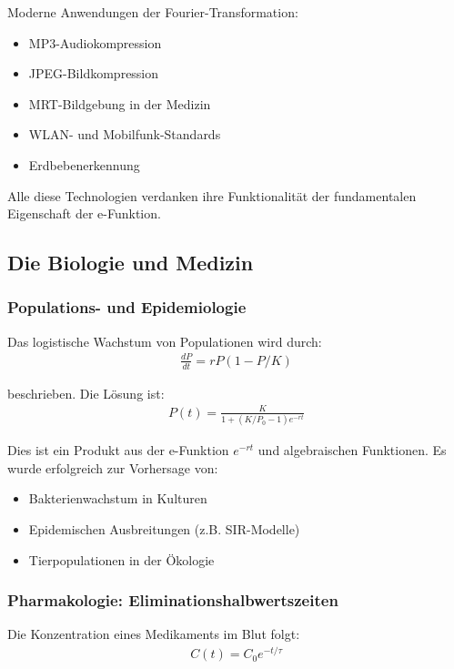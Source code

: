 \documentclass[a4paper,12pt,twoside]{report}
\theoremstyle{definition}
\begin{document}
Moderne Anwendungen der Fourier-Transformation:
\begin{itemize}
	\item[-] MP3-Audiokompression
	\item[-] JPEG-Bildkompression
	\item[-] MRT-Bildgebung in der Medizin
	\item[-] WLAN- und Mobilfunk-Standards
	\item[-] Erdbebenerkennung
\end{itemize}

Alle diese Technologien verdanken ihre Funktionalität der fundamentalen Eigenschaft der e-Funktion.

\subsection{Die Biologie und Medizin}

\subsubsection*{Populations- und Epidemiologie}

Das logistische Wachstum von Populationen wird durch:
\begin{align}
	\frac{dP}{dt} = r P (1 - P/K)
\end{align}

beschrieben. Die Lösung ist:
\begin{align}
	P(t) = \frac{K}{1 + (K/P_0 - 1) e^{-rt}}
\end{align}

Dies ist ein Produkt aus der e-Funktion $e^{-rt}$ und algebraischen Funktionen. Es wurde erfolgreich zur Vorhersage von:
\begin{itemize}
	\item[-] Bakterienwachstum in Kulturen
	\item[-] Epidemischen Ausbreitungen (z.B. SIR-Modelle)
	\item[-] Tierpopulationen in der Ökologie
\end{itemize}

\subsubsection*{Pharmakologie: Eliminationshalbwertszeiten}

Die Konzentration eines Medikaments im Blut folgt:
\begin{align}
	C(t) = C_0 e^{-t/\tau}
\end{align}
\end{document}
